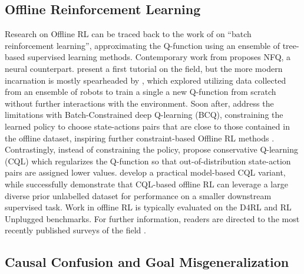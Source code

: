 \documentclass[../thesis-proposal/main.tex]{subfiles}
\begin{document}
\subsection{Offline Reinforcement Learning}

Research on Offline RL can be traced back to the work of \citet{ernst_tree-based_2005} on ``batch
reinforcement learning'', approximating the Q-function using an ensemble of tree-based supervised
learning methods. Contemporary work from \citet{riedmiller_neural_2005} proposes NFQ, a neural
counterpart.  present a first tutorial on the field, but the more modern
incarnation is mostly spearheaded by \citet{kalashnikov_scalable_2018}, which explored utilizing
data collected from an ensemble of robots to train a single a new Q-function from scratch without
further interactions with the environment. Soon after, \citet{fujimoto_off-policy_2019} address the
limitations with Batch-Constrained deep Q-learning (BCQ), constraining the learned policy to choose
state-actions pairs that are close to those contained in the offline dataset, inspiring further
constraint-based Offline RL methods \citep{kumar_stabilizing_2019, xu_offline_2021}. Contrastingly,
instead of constraining the policy, \citet{kumar_conservative_2020} propose conservative Q-learning
(CQL) which regularizes the Q-function so that out-of-distribution state-action pairs are assigned
lower values.  develop a practical model-based CQL variant, while
\citet{singh_cog_2020} successfully demonstrate that CQL-based offline RL can leverage a large
diverse prior unlabelled dataset for performance on a smaller downstream supervised task. Work in
offline RL is typically evaluated on the D4RL \citep{fu_d4rl_2021} and RL Unplugged
\citep{gulcehre_rl_2020} benchmarks. For further information, readers are directed to the most
recently published surveys of the field \citep{levine_offline_2020, prudencio_survey_2022}.

\subsection{Causal Confusion and Goal Misgeneralization} 
\end{document}
